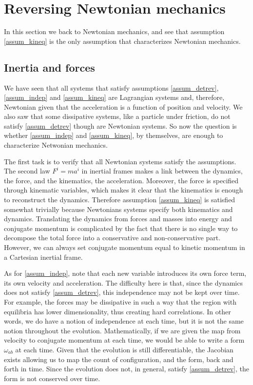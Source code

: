 \section{Reversing Newtonian mechanics}

In this section we back to Newtonian mechanics, and see that assumption \ref{assum_kineq} is the only assumption that characterizes Newtonian mechanics.

\subsection{Inertia and forces}

We have seen that all systems that satisfy assumptions \ref{assum_detrev}, \ref{assum_indep} and \ref{assum_kineq} are Lagrangian systems and, therefore, Newtonian given that the acceleration is a function of position and velocity. We also saw that some dissipative systems, like a particle under friction, do not satisfy \ref{assum_detrev} though are Newtonian systems. So now the question is whether \ref{assum_indep} and \ref{assum_kineq}, by themselves, are enough to characterize Netwonian mechanics.

The first task is to verify that all Newtonian systems satisfy the assumptions. The second law $F^i=ma^i$ in inertial frames makes a link between the dynamics, the force, and the kinematics, the acceleration. Moreover, the force is specified through kinematic variables, which makes it clear that the kinematics is enough to reconstruct the dynamics. Therefore assumption \ref{assum_kineq} is satisfied somewhat trivially because Newtonians systems specify both kinematics and dynamics. Translating the dynamics from forces and masses into energy and conjugate momentum is complicated by the fact that there is no single way to decompose the total force into a conservative and non-conservative part. However, we can always set conjugate momentum equal to kinetic momentum in a Cartesian inertial frame.

As for \ref{assum_indep}, note that each new variable introduces its own force term, its own velocity and acceleration. The difficulty here is that, since the dynamics does not satisfy \ref{assum_detrev}, this independence may not be kept over time. For example, the forces may be dissipative in such a way that the region with equilibria has lower dimensionality, thus creating hard correlations. In other words, we do have a notion of independence at each time, but it is not the same notion throughout the evolution. Mathematically, if we are given the map from velocity to conjugate momentum at each time, we would be able to write a form $\omega_{ab}$ at each time. Given that the evolution is still differentiable, the Jacobian exists allowing us to map the count of configuration, and the form, back and forth in time. Since the evolution does not, in general, satisfy \ref{assum_detrev}, the form is not conserved over time. 

